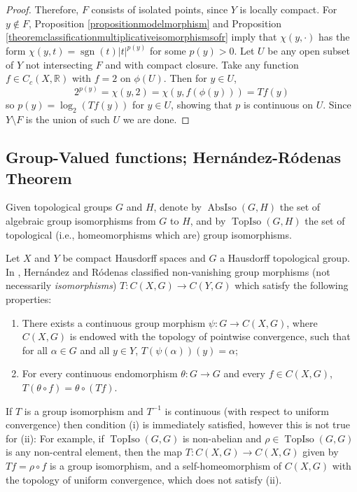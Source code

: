 \begin{proof}
Therefore, $F$ consists of isolated points, since $Y$ is locally compact. For $y\not\in F$, Proposition \ref{propositionmodelmorphism} and Proposition \ref{theoremclassificationmultiplicativeisomorphismsofr} imply that $\chi(y,\cdot)$ has the form $\chi(y,t)=\operatorname{sgn}(t)|t|^{p(y)}$ for some $p(y)>0$. Let $U$ be any open subset of $Y$ not intersecting $F$ and with compact closure. Take any function $f\in C_c(X,\mathbb{R})$ with $f=2$ on $\phi(U)$. Then for $y\in U$,
\[2^{p(y)}=\chi(y,2)=\chi(y,f(\phi(y)))=Tf(y)\]
so $p(y)=\log_2(Tf(y))$ for $y\in U$, showing that $p$ is continuous on $U$. Since $Y\setminus F$ is the union of such $U$ we are done.\qedhere
\end{proof}

\subsection{Group-Valued functions; Hernández-Ródenas Theorem}

Given topological groups $G$ and $H$, denote by $\operatorname{AbsIso}(G,H)$ the set of algebraic group isomorphisms from $G$ to $H$, and by $\operatorname{TopIso}(G,H)$ the set of topological (i.e., homeomorphisms which are) group isomorphisms.

Let $X$ and $Y$ be compact Hausdorff spaces and $G$ a Hausdorff topological group. In \cite[Theorem 3.7]{MR2324919}, Hernández and Ródenas classified non-vanishing group morphisms (not necessarily \emph{isomorphisms}) $T:C(X,G)\to C(Y,G)$ which satisfy the following properties:
\begin{enumerate}
\item[(i)] There exists a continuous group morphism $\psi:G\to C(X,G)$, where $C(X,G)$ is endowed with the topology of pointwise convergence, such that for all $\alpha\in G$ and all $y\in Y$, $T(\psi(\alpha))(y)=\alpha$;
\item[(ii)] For every continuous endomorphism $\theta:G\to G$ and every $f\in C(X,G)$, $T(\theta\circ f)=\theta\circ (Tf)$.
\end{enumerate}
If $T$ is a group isomorphism and $T^{-1}$ is continuous (with respect to uniform convergence) then condition (i) is immediately satisfied, however this is not true for (ii): For example, if $\operatorname{TopIso}(G,G)$ is non-abelian and $\rho\in\operatorname{TopIso}(G,G)$ is any non-central element, then the map $T:C(X,G)\to C(X,G)$ given by $Tf=\rho\circ f$ is a group isomorphism, and a self-homeomorphism of $C(X,G)$ with the topology of uniform convergence, which does not satisfy (ii).

